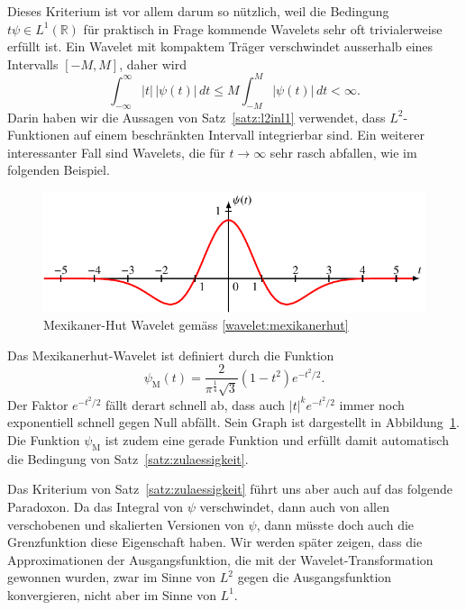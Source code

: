 Dieses Kriterium ist vor allem darum so nützlich, weil die Bedingung
$t\psi\in L^1(\mathbb R)$ für praktisch in Frage kommende Wavelets sehr
oft trivialerweise erfüllt ist.
Ein Wavelet mit kompaktem Träger verschwindet ausserhalb eines Intervalls
$[-M,M]$, daher wird 
\[
\int_{-\infty}^\infty |t|\,|\psi(t)|\,dt
\le 
M \int_{-M}^M |\psi(t)|\,dt < \infty.
\]
Darin haben wir die Aussagen von Satz~\ref{satz:l2inl1} verwendet,
dass $L^2$-Funktionen auf einem beschränkten Intervall integrierbar sind.
Ein weiterer interessanter Fall sind Wavelets, die für $t\to\infty$
sehr rasch abfallen, wie im folgenden Beispiel.

\begin{beispiel}
\begin{figure}
\centering
\includegraphics{chapters/4-cwt/images/mexican.pdf}
\caption{Mexikaner-Hut Wavelet gemäss
\eqref{wavelet:mexikanerhut}
\label{wavelet:mexikanerhut:graph}}
\end{figure}
Das Mexikanerhut-Wavelet ist definiert durch die Funktion
\begin{equation}
\psi_{\text{M}}(t) = \frac{2}{\pi^{\frac14}\sqrt{3}}(1-t^2) e^{-t^2/2}.
\label{wavelet:mexikanerhut}
\end{equation}
Der Faktor $e^{-t^2/2}$ fällt derart schnell ab, dass auch $|t|^k e^{-t^2/2}$
immer noch exponentiell schnell gegen Null abfällt.
Sein Graph ist dargestellt in Abbildung~\ref{wavelet:mexikanerhut:graph}.
Die Funktion $\psi_{\text{M}}$ ist zudem eine gerade Funktion und %
erfüllt damit automatisch die Bedingung von Satz~\ref{satz:zulaessigkeit}.
\end{beispiel}

Das Kriterium von Satz~\ref{satz:zulaessigkeit} führt uns aber auch auf
das folgende Paradoxon. 
Da das Integral von $\psi$ verschwindet, dann auch von allen verschobenen
und skalierten Versionen von $\psi$, dann müsste doch auch die Grenzfunktion
diese Eigenschaft haben.
Wir werden später zeigen, dass die Approximationen der Ausgangsfunktion,
die mit der Wavelet-Transformation gewonnen wurden, zwar im Sinne von $L^2$
gegen die Ausgangsfunktion konvergieren, nicht aber im Sinne von $L^1$.



